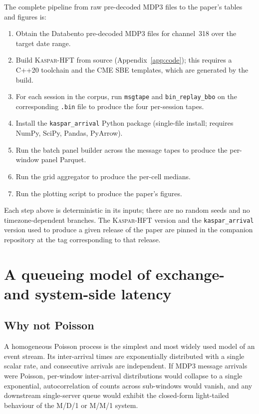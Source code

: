 \documentclass[11pt]{article}
\newcommand{\kasparhft}{\textsc{Kaspar-HFT}}
\begin{document}
The complete pipeline from raw pre-decoded MDP3 files to the paper's tables and figures is:
\begin{enumerate}
    \item Obtain the Databento pre-decoded MDP3 files for channel~318 over the target date range.
    \item Build \kasparhft{} from source (Appendix~\ref{app:code}); this requires a C++20 toolchain and the CME SBE templates, which are generated by the build.
    \item For each session in the corpus, run \texttt{msgtape} and \texttt{bin\_replay\_bbo} on the corresponding \texttt{.bin} file to produce the four per-session tapes.
    \item Install the \texttt{kaspar\_arrival} Python package (single-file install; requires NumPy, SciPy, Pandas, PyArrow).
    \item Run the batch panel builder across the message tapes to produce the per-window panel Parquet.
    \item Run the grid aggregator to produce the per-cell medians.
    \item Run the plotting script to produce the paper's figures.
\end{enumerate}
Each step above is deterministic in its inputs; there are no random seeds and no timezone-dependent branches. The \kasparhft{} version and the \texttt{kaspar\_arrival} version used to produce a given release of the paper are pinned in the companion repository at the tag corresponding to that release.

\section{A queueing model of exchange- and system-side latency}
\label{sec:queue}

\subsection{Why not Poisson}
\label{sec:notpoisson}

A homogeneous Poisson process is the simplest and most widely used model of an event stream. Its inter-arrival times are exponentially distributed with a single scalar rate, and consecutive arrivals are independent. If MDP3 message arrivals were Poisson, per-window inter-arrival distributions would collapse to a single exponential, autocorrelation of counts across sub-windows would vanish, and any downstream single-server queue would exhibit the closed-form light-tailed behaviour of the M/D/1 or M/M/1 system.
\end{document}
